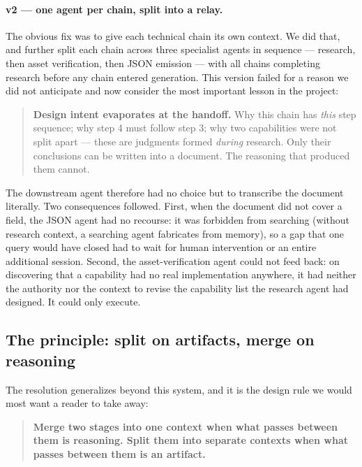 \documentclass[10pt,a4paper]{article}
\begin{document}
\paragraph{v2 --- one agent per chain, split into a relay.} The obvious fix was
to give each technical chain its own context. We did that, and further split each
chain across three specialist agents in sequence --- research, then asset
verification, then JSON emission --- with all chains completing research before
any chain entered generation. This version failed for a reason we did not
anticipate and now consider the most important lesson in the project:

\begin{quote}
\textbf{Design intent evaporates at the handoff.} Why this chain has \emph{this}
step sequence; why step 4 must follow step 3; why two capabilities were not
split apart --- these are judgments formed \emph{during} research. Only their
conclusions can be written into a document. The reasoning that produced them
cannot.
\end{quote}

\noindent The downstream agent therefore had no choice but to transcribe the
document literally. Two consequences followed. First, when the document did not
cover a field, the JSON agent had no recourse: it was forbidden from searching
(without research context, a searching agent fabricates from memory), so a gap
that one query would have closed had to wait for human intervention or an entire
additional session. Second, the asset-verification agent could not feed back: on
discovering that a capability had no real implementation anywhere, it had neither
the authority nor the context to revise the capability list the research agent
had designed. It could only execute.

\subsection{The principle: split on artifacts, merge on reasoning}
\label{sec:principle}

The resolution generalizes beyond this system, and it is the design rule we
would most want a reader to take away:

\begin{quote}
\textbf{Merge two stages into one context when what passes between them is
reasoning. Split them into separate contexts when what passes between them is an
artifact.}
\end{quote}
\end{document}
